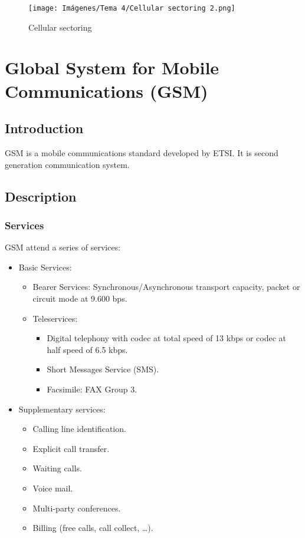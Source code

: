 \documentclass[
	12pt,
	twoside
]{book}
\begin{document}
\begin{figure}[H]
	\centering
	\texttt{[image: Imágenes/Tema 4/Cellular sectoring 2.png]}
	\caption{
		\label{fig:unit4_cell_sect_2}
		Cellular sectoring
	}
\end{figure}

\section{Global System for Mobile Communications (GSM)}

\subsection{Introduction}

GSM is a mobile communications standard developed by ETSI. It is second generation communication system.

\subsection{Description}

\subsubsection{Services}

GSM attend a series of services:

\begin{itemize}
	\item {
		Basic Services:
		\begin{itemize}
			\item Bearer Services: Synchronous/Asynchronous transport capacity, packet or circuit mode at 9.600 bps.
			\item {
				Teleservices:
				\begin{itemize}
					\item Digital telephony with codec at total speed of 13 kbps or codec at half speed of 6.5 kbps.
					\item Short Messages Service (SMS).
					\item Facsimile: FAX Group 3.
				\end{itemize}
			}
		\end{itemize}
	}
	\item {
		Supplementary services:
		\begin{itemize}
			\item Calling line identification.
			\item Explicit call transfer.
			\item Waiting calls.
			\item Voice mail.
			\item Multi-party conferences.
			\item Billing (free calls, call collect, \ldots).
		\end{itemize}
	}
\end{itemize}
\end{document}
